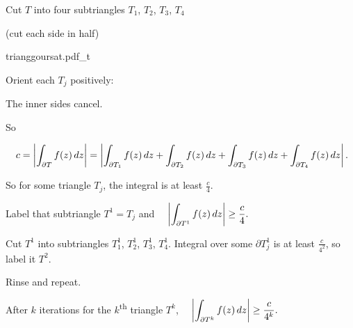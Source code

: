 \documentclass[10pt,aspectratio=169]{beamer}
\begin{document}
\begin{frame}
Cut $T$ into four subtriangles $T_1$, $T_2$, $T_3$, $T_4$

(cut each side in half)

\vspace*{-0.5in}
\hspace*{2.5in}
{trianggoursat.pdf_t}

\vspace*{-0.7in}
\pause

Orient each $T_j$ positively:

\medskip

The inner sides cancel.

\medskip
\pause

So

\medskip

$\displaystyle
\quad
c = 
\left\lvert {\int_{\partial T} f(z) \, dz } \right\rvert
=
\left\lvert {\int_{\partial T_1} f(z) \, dz 
+
\int_{\partial T_2} f(z) \, dz 
+
\int_{\partial T_3} f(z) \, dz 
+
\int_{\partial T_4} f(z) \, dz } \right\rvert . $

\medskip
\pause

So for some triangle $T_j$, the integral is at least $\frac{c}{4}$.

\medskip
\pause

Label that subtriangle $T^1 = T_j$ and
$\displaystyle
\quad
\left\lvert {\int_{\partial T^1} f(z) \, dz } \right\rvert \geq \frac{c}{4} .$

\medskip
\pause

Cut $T^1$ into subtriangles $T_1^1$, $T_2^1$, $T_3^1$, $T_4^1$.
\pause
Integral over some $\partial T_j^1$ is at least $\frac{c}{4^2}$, so label it $T^2$.

\pause

Rinse and repeat.

\pause
\medskip

After $k$ iterations for the $k$\textsuperscript{th} triangle $T^k$,
$\displaystyle
\quad
\left\lvert {\int_{\partial T^k} f(z) \, dz } \right\rvert \geq \frac{c}{4^k}.$
\end{frame}
\end{document}
